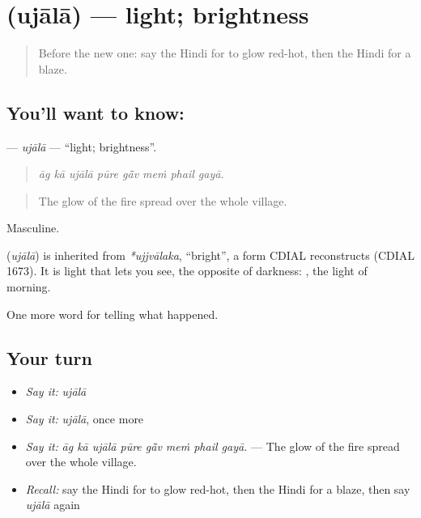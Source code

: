 \section[\texorpdfstring{\hi{उजाला} (ujālā)}{उजाला (ujālā)}]{ (ujālā) — light; brightness}

\label{lesson:HI-C300-ujala}



\begin{quote}
Before the new one: say the Hindi for to glow red-hot, then the Hindi for a blaze.
\end{quote}

\subsection*{You'll want to know: }
\textbf{} — \emph{ujālā} — \textquotedblleft{}light; brightness\textquotedblright{}.

\begin{quote}
       
\end{quote}

\begin{quote}
\emph{āg kā ujālā pūre gā̃v meṁ phail gayā.}
\end{quote}

\begin{quote}
The glow of the fire spread over the whole village.
\end{quote}

Masculine.

\begin{cousinweb}
\textbf{} (\emph{ujālā}) is inherited from \emph{*ujjvālaka}, \textquotedblleft{}bright\textquotedblright{}, a form CDIAL reconstructs (CDIAL 1673). It is light that lets you see, the opposite of darkness: \textbf{  }, the light of morning.
\end{cousinweb}

\begin{grammarlens}[title={What you've built}]
One more word for telling what happened.
\end{grammarlens}

\subsection*{Your turn}
\begin{itemize}
\raggedright
  \item \emph{Say it:} \emph{ujālā}
  \item \emph{Say it:} \emph{ujālā}, once more
  \item \emph{Say it:} \emph{āg kā ujālā pūre gā̃v meṁ phail gayā.} — The glow of the fire spread over the whole village.
  \item \emph{Recall:} say the Hindi for to glow red-hot, then the Hindi for a blaze, then say \emph{ujālā} again
\end{itemize}

